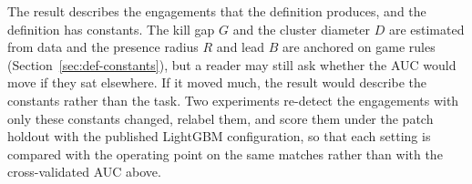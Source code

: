 The result describes the engagements that the definition produces, and the definition has constants. The
kill gap $G$ and the cluster diameter $D$ are estimated from data and the presence radius $R$ and lead $B$
are anchored on game rules (Section~\ref{sec:def-constants}), but a reader may still ask whether the AUC
would move if they sat elsewhere. If it moved much, the result would describe the constants rather than
the task. Two experiments re-detect the engagements with only these constants changed, relabel them, and
score them under the patch holdout with the published LightGBM configuration, so that each setting is
compared with the operating point on the same matches rather than with the cross-validated AUC above.


